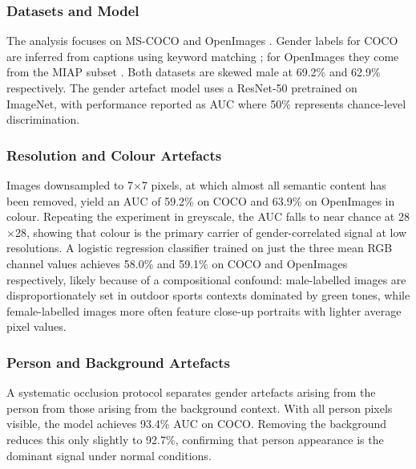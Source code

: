 \subsubsection*{Datasets and Model}
\label{subsubsec:meister_datasets}

The analysis focuses on MS-COCO \cite{Lin_2014_COCO} and
OpenImages \cite{Kuznetsova_2020_OpenImagesV4}. Gender labels for COCO are inferred from captions using keyword matching \cite{Zhao_2017_MenAlsoLikeShopping}; for OpenImages they
come from the MIAP subset \cite{Schumann_2021_StepInclusivePeopleAnnotations}. Both
datasets are skewed male at 69.2\% and 62.9\% respectively. The gender artefact model uses a ResNet-50 \cite{He_2016_DeepResidualLearning} pretrained on ImageNet, with performance
reported as AUC where 50\% represents chance-level discrimination.

\subsubsection*{Resolution and Colour Artefacts}
\label{subsubsec:meister_colour}

Images downsampled to 7$\times$7 pixels, at which almost all semantic content has been removed, yield an AUC of 59.2\% on COCO and 63.9\% on OpenImages in colour. Repeating
the experiment in greyscale, the AUC falls to near chance at 28$\times$28, showing that
colour is the primary carrier of gender-correlated signal at low resolutions. A logistic
regression classifier trained on just the three mean RGB channel values achieves 58.0\%
and 59.1\% on COCO and OpenImages respectively, likely because of a compositional confound:
male-labelled images are disproportionately set in outdoor sports contexts dominated by
green tones, while female-labelled images more often feature close-up portraits with
lighter average pixel values.

\subsubsection*{Person and Background Artefacts}
\label{subsubsec:meister_person}

A systematic occlusion protocol separates gender artefacts arising from the person from
those arising from the background context. With all person pixels visible, the model achieves
93.4\% AUC on COCO. Removing the background reduces this only slightly to 92.7\%, confirming that person appearance is the dominant signal under normal conditions.

